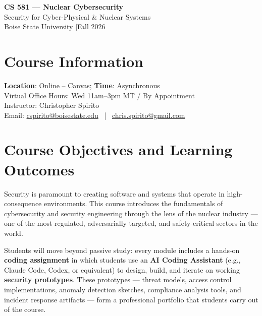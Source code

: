\documentclass[9pt]{extarticle}
\begin{document}
\begin{center}
    {\large\textbf{CS 581 --- Nuclear Cybersecurity}} \\[2pt]
    {\normalsize Security for Cyber-Physical \& Nuclear Systems} \\[1pt]
    {\normalsize Boise State University \quad|\quad Fall 2026}
\end{center}
\vspace{2pt}

\section*{Course Information}

\textbf{Location}: Online -- Canvas; \textbf{Time}: Asynchronous \\
Virtual Office Hours: Wed 11am--3pm MT / By Appointment \\
Instructor: Christopher Spirito \\
Email: \href{mailto:cspirito@boisestate.edu}{cspirito@boisestate.edu} ~|~ \href{mailto:chris.spirito@gmail.com}{chris.spirito@gmail.com}

\section*{Course Objectives and Learning Outcomes}

Security is paramount to creating software and systems that operate in
high-consequence environments. This course introduces the fundamentals of
cybersecurity and security engineering through the lens of the nuclear industry
--- one of the most regulated, adversarially targeted, and safety-critical
sectors in the world.

\medskip

Students will move beyond passive study: every module includes a hands-on
\textbf{coding assignment} in which students use an \textbf{AI Coding Assistant}
(e.g., Claude Code, Codex, or equivalent) to design, build,
and iterate on working \textbf{security prototypes}. These prototypes --- threat
models, access control implementations, anomaly detection sketches, compliance
analysis tools, and incident response artifacts --- form a professional portfolio
that students carry out of the course.
\end{document}
